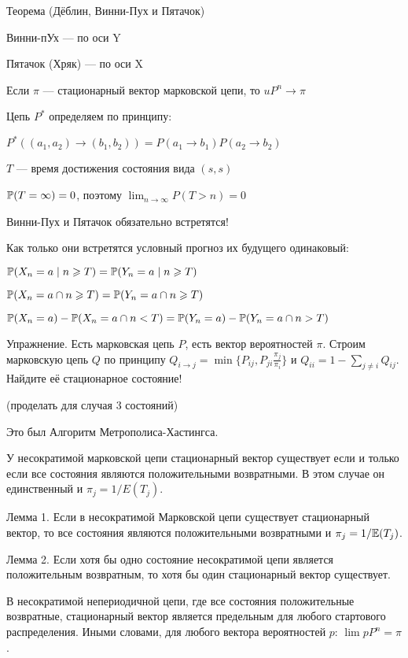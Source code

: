 Теорема (Дёблин, Винни-Пух и Пятачок)

Винни-пУх --- по оси Y

Пятачок (Хряк) --- по оси X

Если $\pi$ --- стационарный вектор марковской цепи, то $uP^n\to \pi$


Цепь $P^*$ определяем по принципу:

$P^*\left((a_1,a_2)\to (b_1,b_2)\right)=P(a_1\to b_1)P(a_2\to b_2)$

$T$ --- время достижения состояния вида $(s,s)$


$\P(T=\infty)=0$, поэтому $\lim_{n\to\infty} P(T>n)=0$

Винни-Пух и Пятачок обязательно встретятся!

Как только они встретятся условный прогноз их  будущего одинаковый:

$\P(X_n=a\mid n\geq T)=\P(Y_n=a\mid n\geq T)$

$\P(X_n=a \cap n\geq T)=\P(Y_n=a \cap n\geq T)$


$\P(X_n=a)-\P(X_n=a \cap n<T)=\P(Y_n=a)-\P(Y_n=a \cap n> T)$




Упражнение. Есть марковская цепь $P$, есть вектор вероятностей $\pi$. Строим марковскую цепь $Q$ по принципу $Q_{i\to j}=\min \{ P_{ij}, P_{ji}\frac{\pi_j}{\pi_i} \}$ и $Q_{ii}=1-\sum_{j\neq i} Q_{ij}$. Найдите её стационарное состояние!


(проделать для случая 3 состояний)

Это был Алгоритм Метрополиса-Хастингса.




\begin{theorem}
У несократимой марковской цепи стационарный вектор существует если и только если все состояния являются положительными возвратными. В этом случае он единственный и $\pi_j=1/E(T_j)$.
\end{theorem}



Лемма 1. Если в несократимой Марковской цепи существует стационарный вектор, то все состояния являются положительными возвратными и $\pi_j=1/\E(T_j)$.


Лемма 2. Если хотя бы одно состояние несократимой цепи является положительным возвратным, то хотя бы один стационарный вектор существует.


\begin{theorem}
В несократимой непериодичной цепи, где все состояния положительные возвратные, стационарный вектор является предельным для любого стартового распределения. Иными словами, для любого вектора вероятностей $p$: $\lim p P^{n}=\pi$.
\end{theorem}

